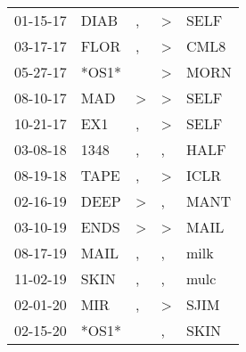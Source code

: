 \begin{supertabular}{lllll}
 01-15-17 &   DIAB &                , &     \textgreater &   SELF \\
 03-17-17 &   FLOR &                , &     \textgreater &   CML8 \\
 05-27-17 &  *OS1* &                  &     \textgreater &   MORN \\
 08-10-17 &    MAD &     \textgreater &     \textgreater &   SELF \\
 10-21-17 &    EX1 &                , &     \textgreater &   SELF \\
 03-08-18 &   1348 &                , &                , &   HALF \\
 08-19-18 &   TAPE &                , &     \textgreater &   ICLR \\
 02-16-19 &   DEEP &     \textgreater &                , &   MANT \\
 03-10-19 &   ENDS &     \textgreater &     \textgreater &   MAIL \\
 08-17-19 &   MAIL &                , &                , &   milk \\
 11-02-19 &   SKIN &                , &                , &   mulc \\
 02-01-20 &    MIR &                , &     \textgreater &   SJIM \\
 02-15-20 &  *OS1* &                  &                , &   SKIN \\
\end{supertabular}

